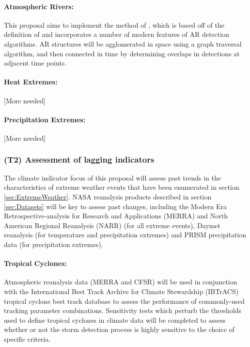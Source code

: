 \documentclass[11pt]{article}
\begin{document}
\paragraph{Atmospheric Rivers:}  This proposal aims to implement the method of \cite{jiang2014intermediate}, which is based off of the definition of \cite{ralph2004satellite} and incorporates a number of modern features of AR detection algorithms.  AR structures will be agglomerated in space using a graph traversal algorithm, and then connected in time by determining overlaps in detections at adjacent time points.

\paragraph{Heat Extremes:}  {\color{red} [More needed]}

\paragraph{Precipitation Extremes:}  {\color{red} [More needed]}

\subsubsection{(T2) Assessment of lagging indicators}

The climate indicator focus of this proposal will assess past trends in the characteristics of extreme weather events that have been enumerated in section \ref{sec:ExtremeWeather}.  NASA reanalysis products described in section \ref{sec:Datasets} will be key to assess past changes, including the Modern Era Retrospective-analysis for Research and Applications (MERRA) and North American Regional Reanalysis (NARR) (for all extreme events), Daymet reanalysis (for temperature and precipitation extremes) and PRISM precipitation data (for precipitation extremes).

\paragraph{Tropical Cyclones:}  Atmospheric reanalysis data (MERRA and CFSR) will be used in conjunction with the International Best Track Archive for Climate Stewardship (IBTrACS) tropical cyclone best track database \citep{Knapp2010} to assess the performance of commonly-used tracking parameter combinations. Sensitivity tests which perturb the thresholds used to define tropical cyclones in climate data will be completed to assess whether or not the storm detection process is highly sensitive to the choice of specific criteria.
\end{document}
